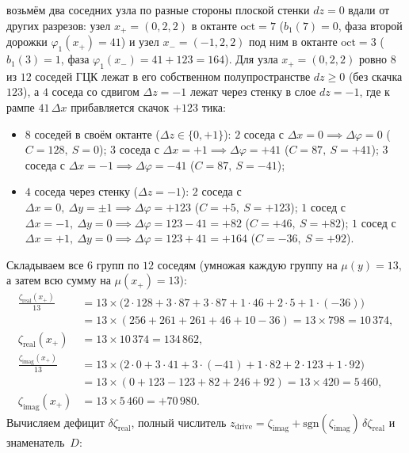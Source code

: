 \begin{corollary}[Единство природы и количества заряда: частное и остаток одного деления на $\phaseRingCount = 512$]
\begin{enumerate}[label=(\roman*)]
\begin{enumerate}[label=(\alph*),nosep]
    возьмём два соседних узла по разные стороны плоской стенки $dz=0$ вдали от других разрезов: узел $x_+ = (0,2,2)$ в октанте $\mathrm{oct}=7$ ($b_1(7)=0$, фаза второй дорожки $\varphi_1(x_+)=41$) и узел $x_- = (-1,2,2)$ под ним в октанте $\mathrm{oct}=3$ ($b_1(3)=1$, фаза $\varphi_1(x_-) = 41 + 123 = 164$).
    Для узла $x_+=(0,2,2)$ ровно $8$ из $12$ соседей ГЦК лежат в его собственном полупространстве $dz\ge 0$ (без скачка $123$), а $4$ соседа со сдвигом $\Delta z = -1$ лежат через стенку в слое $dz=-1$, где к рампе $41\,\Delta x$ прибавляется скачок $+123$ тика:
    \begin{itemize}[nosep,leftmargin=*]
    \item $8$ соседей в своём октанте ($\Delta z\in\{0,+1\}$): $2$ соседа с $\Delta x=0 \implies \Delta\varphi=0$ ($C=128,\ S=0$); $3$ соседа с $\Delta x=+1 \implies \Delta\varphi=+41$ ($C=87,\ S=+41$); $3$ соседа с $\Delta x=-1 \implies \Delta\varphi=-41$ ($C=87,\ S=-41$);
    \item $4$ соседа через стенку ($\Delta z=-1$): $2$ соседа с $\Delta x=0,\ \Delta y=\pm 1 \implies \Delta\varphi = +123$ ($C=+5,\ S=+123$); $1$ сосед с $\Delta x=-1,\ \Delta y=0 \implies \Delta\varphi = 123-41 = +82$ ($C=+46,\ S=+82$); $1$ сосед с $\Delta x=+1,\ \Delta y=0 \implies \Delta\varphi = 123+41 = +164$ ($C=-36,\ S=+92$).
    \end{itemize}
    Складываем все $6$ групп по $12$ соседям (умножая каждую группу на $\mu(y)=13$, а затем всю сумму на $\mu(x_+)=13$):
    \begin{align*}
      \frac{\zeta_{\mathrm{real}}(x_+)}{13}
      &= 13\times\bigl(2\cdot 128 + 3\cdot 87 + 3\cdot 87 + 1\cdot 46 + 2\cdot 5 + 1\cdot(-36)\bigr)\\
      &= 13\times(256 + 261 + 261 + 46 + 10 - 36) = 13\times 798 = 10\,374,\\
      \zeta_{\mathrm{real}}(x_+) &= 13\times 10\,374 = 134\,862,\\
      \frac{\zeta_{\mathrm{imag}}(x_+)}{13}
      &= 13\times\bigl(2\cdot 0 + 3\cdot 41 + 3\cdot(-41) + 1\cdot 82 + 2\cdot 123 + 1\cdot 92\bigr)\\
      &= 13\times(0 + 123 - 123 + 82 + 246 + 92) = 13\times 420 = 5\,460,\\
      \zeta_{\mathrm{imag}}(x_+) &= 13\times 5\,460 = +70\,980.
    \end{align*}
    Вычисляем дефицит $\delta\zeta_{\mathrm{real}}$, полный числитель $z_{\mathrm{drive}} = \zeta_{\mathrm{imag}} + \mathrm{sgn}(\zeta_{\mathrm{imag}})\,\delta\zeta_{\mathrm{real}}$ и знаменатель~$D$:

\end{enumerate}
\end{enumerate}
\end{corollary}
